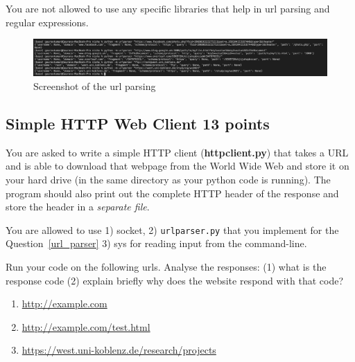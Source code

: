 \documentclass{resources/WeSTassignment}
\begin{document}
\begin{enumerate}
\begin{enumerate}
\end{enumerate}

You are not allowed to use any specific libraries that help in url parsing and regular expressions. 

\begin{figure}[h!]
  \includegraphics[width=\linewidth]{resources/urlparser.png}
  \caption{Screenshot of the url parsing}
  \label{Screenshot of the url parsing}
\end{figure}

\subsection{Simple HTTP Web Client \hfill{13 points}}
You are asked to write a simple HTTP client (\textbf{httpclient.py})
that takes a URL and is able to download that webpage from the World Wide Web and store it on your hard drive (in the same
directory as your python code is running). The program should also print out the complete
HTTP header of the response and store the header in a \textit{separate file}.


You are allowed to use 1) socket, 2) \texttt{urlparser.py} that you implement for the Question~\ref{url_parser} 3) sys for reading input from the command-line. 


Run your code on the following urls. Analyse the responses: (1) what is the response code (2) explain briefly why does the website respond with that code? 
\begin{enumerate}
\item 
\url{http://example.com}
\item\url{http://example.com/test.html}
\item 
\url{https://west.uni-koblenz.de/research/projects}
\end{enumerate}


\end{enumerate}
\end{document}
